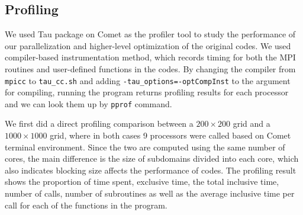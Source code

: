 \documentclass{article}
\begin{document}
\subsection{Profiling}

We used Tau package on Comet as the profiler tool to study the performance of our parallelization and higher-level optimization of the original codes. We used compiler-based instrumentation method, which records timing for both the MPI routines and user-defined functions in the codes. By changing the compiler from \texttt{mpicc} to \texttt{tau\_cc.sh} and adding \texttt{-tau\_options=-optCompInst} to the argument for compiling, running the program returns profiling results for each processor and we can look them up by \texttt{pprof} command.

We first did a direct profiling comparison between a $200\times200$ grid and a $1000\times1000$ grid, where in both cases 9 processors were called based on Comet terminal environment. Since the two are computed using the same number of cores, the main difference is the size of subdomains divided into each core, which also indicates blocking size affects the performance of codes. The profiling result shows the proportion of time spent, exclusive time, the total inclusive time, number of calls, number of subroutines as well as the average inclusive time per call for each of the functions in the program.
\end{document}
